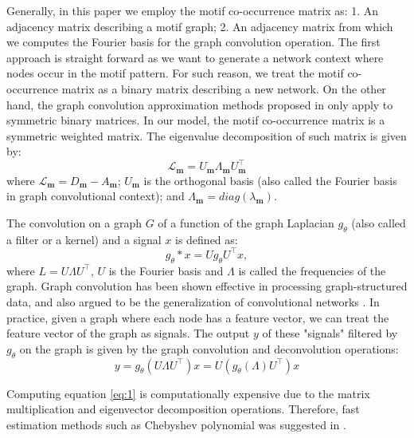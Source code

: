\documentclass{article}
\theoremstyle{definition}
\begin{document}
Generally, in this paper we employ the motif co-occurrence matrix
as: 1. An adjacency matrix describing a motif graph; 2. An adjacency
matrix from which we computes the Fourier basis for the graph convolution
operation. The first approach is straight forward as we want to generate
a network context where nodes occur in the motif pattern. For such reason,
we treat the motif co-occurrence matrix as a binary matrix describing a new
network. On the other hand, the graph convolution approximation methods 
proposed in \cite{gcn,defferrard2016convolutional} only apply to symmetric 
binary matrices. In our model, the motif co-occurrence matrix is a symmetric 
weighted matrix. The eigenvalue decomposition of such matrix is given by:
\begin{equation} \label{eq:eigm}
\mathcal{L}_{\mathbf{m}} = U_{\mathbf{m}} \Lambda_{\mathbf{m}} U^{\top}_{\mathbf{m}}
\end{equation}
where $\mathcal{L}_{\mathbf{m}} = D_{\mathbf{m}} - A_{\mathbf{m}}$; $U_{\mathbf{m}}$ is the
orthogonal basis (also called the Fourier basis in graph convolutional context);
and $\Lambda_{\mathbf{m}} = diag(\lambda_{\mathbf{m}})$. 

The convolution on a graph $G$ of a function of the graph 
Laplacian $g_{\theta}$ (also called a filter or a kernel) 
and a signal $x$ is defined as:
$$g_{\theta} \ast x = U g_{\theta} U^{\top} x,$$
where $L = U \Lambda U^\top$, $U$ is the Fourier basis
and $\Lambda$ is called the frequencies of the graph. 
Graph convolution has been shown effective in processing
graph-structured data, and also argued to be the generalization
of convolutional networks
\cite{shuman2013emerging,defferrard2016convolutional,gcn}.
In practice, given a graph where each node has a feature vector,
we can treat the feature vector of the graph as signals. The output $y$
of these "signals" filtered by $g_\theta$ on the graph is given by
the graph convolution and deconvolution operations: 
\begin{equation}
\label{eq:1}
y = g_\theta (U \Lambda U^\top) x = U (g_\theta(\Lambda) U^\top)x
\end{equation}

Computing equation \ref{eq:1} is computationally expensive
due to the matrix multiplication and eigenvector decomposition operations.
Therefore, fast estimation methods such as Chebyshev polynomial was suggested
in \cite{hammond2011wavelets}.
\end{document}
